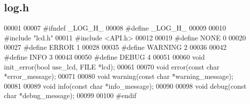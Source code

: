 \subsection{log.\+h}
\label{log_8h_source}

\begin{DoxyCode}
00001 
00007 \textcolor{preprocessor}{#ifndef \_LOG\_H\_}
00008 \textcolor{preprocessor}{#define \_LOG\_H\_}
00009 
00010 \textcolor{preprocessor}{#include "lcd.h"}
00011 \textcolor{preprocessor}{#include <API.h>}
00012 
00019 \textcolor{preprocessor}{#define NONE 0}
00020 
00027 \textcolor{preprocessor}{#define ERROR 1}
00028 
00035 \textcolor{preprocessor}{#define WARNING 2}
00036 
00042 \textcolor{preprocessor}{#define INFO 3}
00043 
00050 \textcolor{preprocessor}{#define DEBUG 4}
00051 
00060 \textcolor{keywordtype}{void} init_error(\textcolor{keywordtype}{bool} use\_lcd, FILE *lcd);
00061 
00070 \textcolor{keywordtype}{void} error(\textcolor{keyword}{const} \textcolor{keywordtype}{char} *error\_message);
00071 
00080 \textcolor{keywordtype}{void} warning(\textcolor{keyword}{const} \textcolor{keywordtype}{char} *warning\_message);
00081 
00089 \textcolor{keywordtype}{void} info(\textcolor{keyword}{const} \textcolor{keywordtype}{char} *info\_message);
00090 
00098 \textcolor{keywordtype}{void} debug(\textcolor{keyword}{const} \textcolor{keywordtype}{char} *debug\_message);
00099 
00100 \textcolor{preprocessor}{#endif}
\end{DoxyCode}
